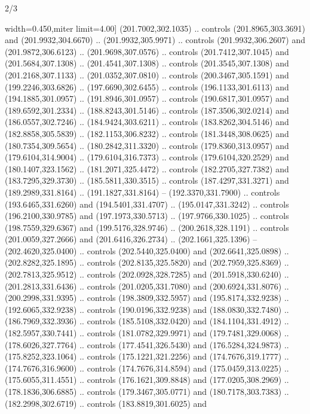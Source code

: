 \begin{flagdescription}{2/3}
\begin{scope}[xshift=0.5\flaglength,yshift=0.5\flagwidth,scale=\flagwidth/311.22]
\begin{scope}[y=0.8pt, x=0.8pt, yscale=-1,shift={(-291.77,-194.51)}]
  width=0.450\lw,miter limit=4.00] (201.7002,302.1035) .. controls
  (201.8965,303.3691) and (201.9932,304.6670) .. (201.9932,305.9971) .. controls
  (201.9932,306.2607) and (201.9872,306.6123) .. (201.9698,307.0576) .. controls
  (201.7412,307.1045) and (201.5684,307.1308) .. (201.4541,307.1308) .. controls
  (201.3545,307.1308) and (201.2168,307.1133) .. (201.0352,307.0810) .. controls
  (200.3467,305.1591) and (199.2246,303.6826) .. (197.6690,302.6455) .. controls
  (196.1133,301.6113) and (194.1885,301.0957) .. (191.8946,301.0957) .. controls
  (190.6817,301.0957) and (189.6592,301.2334) .. (188.8243,301.5146) .. controls
  (187.3506,302.0214) and (186.0557,302.7246) .. (184.9424,303.6211) .. controls
  (183.8262,304.5146) and (182.8858,305.5839) .. (182.1153,306.8232) .. controls
  (181.3448,308.0625) and (180.7354,309.5654) .. (180.2842,311.3320) .. controls
  (179.8360,313.0957) and (179.6104,314.9004) .. (179.6104,316.7373) .. controls
  (179.6104,320.2529) and (180.1407,323.1562) .. (181.2071,325.4472) .. controls
  (182.2705,327.7382) and (183.7295,329.3730) .. (185.5811,330.3515) .. controls
  (187.4297,331.3271) and (189.2989,331.8164) .. (191.1827,331.8164) --
  (192.3370,331.7900) .. controls (193.6465,331.6260) and (194.5401,331.4707) ..
  (195.0147,331.3242) .. controls (196.2100,330.9785) and (197.1973,330.5713) ..
  (197.9766,330.1025) .. controls (198.7559,329.6367) and (199.5176,328.9746) ..
  (200.2618,328.1191) .. controls (201.0059,327.2666) and (201.6416,326.2734) ..
  (202.1661,325.1396) -- (202.4620,325.0400) .. controls (202.5440,325.0400) and
  (202.6641,325.0898) .. (202.8282,325.1895) .. controls (202.8135,325.5820) and
  (202.7959,325.8369) .. (202.7813,325.9512) .. controls (202.0928,328.7285) and
  (201.5918,330.6240) .. (201.2813,331.6436) .. controls (201.0205,331.7080) and
  (200.6924,331.8076) .. (200.2998,331.9395) .. controls (198.3809,332.5957) and
  (195.8174,332.9238) .. (192.6065,332.9238) .. controls (190.0196,332.9238) and
  (188.0830,332.7480) .. (186.7969,332.3936) .. controls (185.5108,332.0420) and
  (184.1104,331.4912) .. (182.5957,330.7441) .. controls (181.0782,329.9971) and
  (179.7481,329.0068) .. (178.6026,327.7764) .. controls (177.4541,326.5430) and
  (176.5284,324.9873) .. (175.8252,323.1064) .. controls (175.1221,321.2256) and
  (174.7676,319.1777) .. (174.7676,316.9600) .. controls (174.7676,314.8594) and
  (175.0459,313.0225) .. (175.6055,311.4551) .. controls (176.1621,309.8848) and
  (177.0205,308.2969) .. (178.1836,306.6885) .. controls (179.3467,305.0771) and
  (180.7178,303.7383) .. (182.2998,302.6719) .. controls (183.8819,301.6025) and

\end{scope}
\end{scope}
\end{flagdescription}
